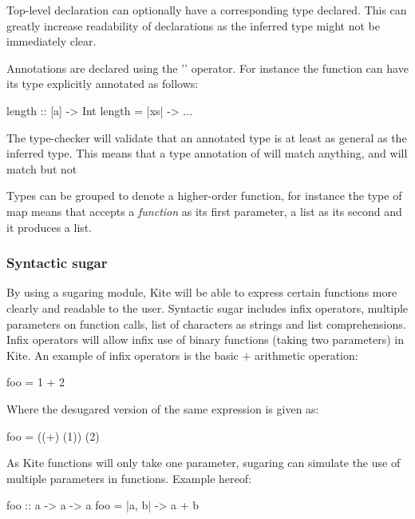 Top-level declaration can optionally have a corresponding type declared. This can greatly increase readability of declarations as the inferred type might not be immediately clear.

Annotations are declared using the '\code{::}' operator. For instance the function  can have its type explicitly annotated as follows:

\begin{kite}
length :: [a] -> Int
length = |xs| -> {
  ...
}
\end{kite}

The type-checker will validate that an annotated type is at least as general as the inferred type. This means that a type annotation of  will match anything, and  will match  but not 

Types can be grouped to denote a higher-order function, for instance the type of map  means that  accepts a \emph{function} as its first parameter, a list as its second and it produces a list.

\clearpage

\subsubsection{Syntactic sugar}
\label{sec:kite-design-sugar}
By using a sugaring module, Kite will be able to express certain functions more clearly and readable to the user. Syntactic sugar includes infix operators, multiple parameters on function calls, list of characters as strings and list comprehensions. Infix operators will allow infix use of binary functions (taking two parameters) in Kite. An example of infix operators is the basic $+$ arithmetic operation:

\begin{kite}
foo = 1 + 2
\end{kite}

Where the desugared version of the same expression is given as:

\begin{kite}
foo = ((+) (1)) (2)
\end{kite}

As Kite functions will only take one parameter, sugaring can simulate the use of multiple parameters in functions. Example hereof:

\begin{kite}
foo :: a -> a -> a
foo = |a, b| -> {
  a + b
}
\end{kite}

